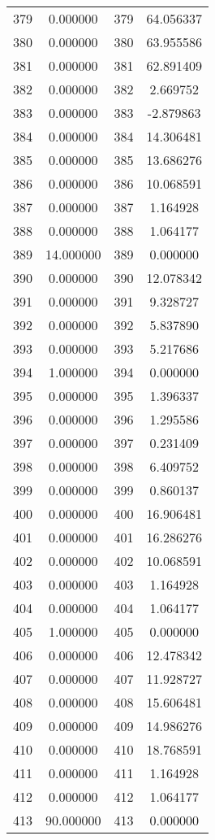 \documentclass[12pt]{article}
\begin{document}
\begin{longtable}{@{}cccc@{}}
379 & 0.000000 & 379 & 64.056337 \\
380 & 0.000000 & 380 & 63.955586 \\
381 & 0.000000 & 381 & 62.891409 \\
382 & 0.000000 & 382 & 2.669752 \\
383 & 0.000000 & 383 & -2.879863 \\
384 & 0.000000 & 384 & 14.306481 \\
385 & 0.000000 & 385 & 13.686276 \\
386 & 0.000000 & 386 & 10.068591 \\
387 & 0.000000 & 387 & 1.164928 \\
388 & 0.000000 & 388 & 1.064177 \\
389 & 14.000000 & 389 & 0.000000 \\
390 & 0.000000 & 390 & 12.078342 \\
391 & 0.000000 & 391 & 9.328727 \\
392 & 0.000000 & 392 & 5.837890 \\
393 & 0.000000 & 393 & 5.217686 \\
394 & 1.000000 & 394 & 0.000000 \\
395 & 0.000000 & 395 & 1.396337 \\
396 & 0.000000 & 396 & 1.295586 \\
397 & 0.000000 & 397 & 0.231409 \\
398 & 0.000000 & 398 & 6.409752 \\
399 & 0.000000 & 399 & 0.860137 \\
400 & 0.000000 & 400 & 16.906481 \\
401 & 0.000000 & 401 & 16.286276 \\
402 & 0.000000 & 402 & 10.068591 \\
403 & 0.000000 & 403 & 1.164928 \\
404 & 0.000000 & 404 & 1.064177 \\
405 & 1.000000 & 405 & 0.000000 \\
406 & 0.000000 & 406 & 12.478342 \\
407 & 0.000000 & 407 & 11.928727 \\
408 & 0.000000 & 408 & 15.606481 \\
409 & 0.000000 & 409 & 14.986276 \\
410 & 0.000000 & 410 & 18.768591 \\
411 & 0.000000 & 411 & 1.164928 \\
412 & 0.000000 & 412 & 1.064177 \\
413 & 90.000000 & 413 & 0.000000 \\

\end{longtable}
\end{document}
